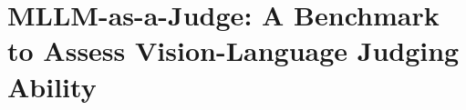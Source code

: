 \section{{MLLM-as-a-Judge}: A Benchmark to Assess Vision-Language Judging Ability}
\label{Section 3: MLLM-as-a-Judge}

\begin{table}[t]
\centering
\caption{The statistics of responses in different steps for MLLM judging. In \textit{Step 3}, under the w.o. vision input settings, we sample 10\% from the original data and mainly proceed with  and . We only list the amount of judgments generated by four models here. M-I: Image-Instruction.}
\renewcommand\arraystretch{1.1}
\label{table: comparison}
\end{table}
